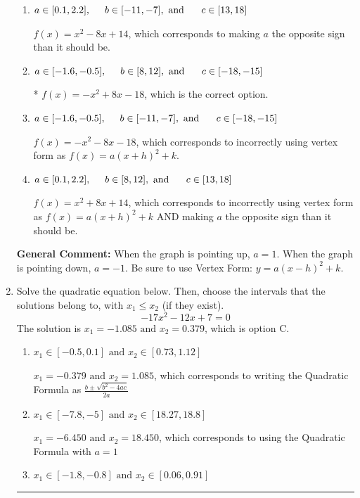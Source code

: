 \documentclass{extbook}[14pt]
\newcommand{\litem}[1]{\item #1

\rule{\textwidth}{0.4pt}}
\begin{document}
\begin{enumerate}
{\begin{enumerate}[label=\Alph*.]
$f(x)=-x^{2} -8 x -14$, which corresponds to incorrectly using vertex form as $f(x) = a(x+h)^2 - k$.
\item \( a \in [0.1, 2.2], \hspace*{5mm} b \in [-11, -7], \text{ and } \hspace*{5mm} c \in [13, 18] \)

$f(x)=x^{2} -8 x + 14$, which corresponds to making $a$ the opposite sign than it should be.
\item \( a \in [-1.6, -0.5], \hspace*{5mm} b \in [8, 12], \text{ and } \hspace*{5mm} c \in [-18, -15] \)

* $f(x)=-x^{2} +8 x -18$, which is the correct option.
\item \( a \in [-1.6, -0.5], \hspace*{5mm} b \in [-11, -7], \text{ and } \hspace*{5mm} c \in [-18, -15] \)

$f(x)=-x^{2} -8 x -18$, which corresponds to incorrectly using vertex form as $f(x) = a(x+h)^2+k$.
\item \( a \in [0.1, 2.2], \hspace*{5mm} b \in [8, 12], \text{ and } \hspace*{5mm} c \in [13, 18] \)

$f(x)=x^{2} +8 x + 14$, which corresponds to incorrectly using vertex form as $f(x) = a(x+h)^2+k$ AND making $a$ the opposite sign than it should be.
\end{enumerate}

\textbf{General Comment:} When the graph is pointing up, $a=1$. When the graph is pointing down, $a=-1$. Be sure to use Vertex Form: $y = a(x-h)^2+k$.
}
\litem{
Solve the quadratic equation below. Then, choose the intervals that the solutions belong to, with $x_1 \leq x_2$ (if they exist).
\[ -17x^{2} -12 x + 7 = 0 \]The solution is \( x_1 = -1.085 \text{ and } x_2 = 0.379 \), which is option C.\begin{enumerate}[label=\Alph*.]
\item \( x_1 \in [-0.5, 0.1] \text{ and } x_2 \in [0.73, 1.12] \)

 $x_1 = -0.379 \text{ and } x_2 = 1.085$, which corresponds to writing the Quadratic Formula as $\frac{b \pm \sqrt{b^2 - 4ac}}{2a}$
\item \( x_1 \in [-7.8, -5] \text{ and } x_2 \in [18.27, 18.8] \)

 $x_1 = -6.450 \text{ and } x_2 = 18.450$, which corresponds to using the Quadratic Formula with $a=1$
\item \( x_1 \in [-1.8, -0.8] \text{ and } x_2 \in [0.06, 0.91] \)


\end{enumerate}}
\end{enumerate}
\end{document}
